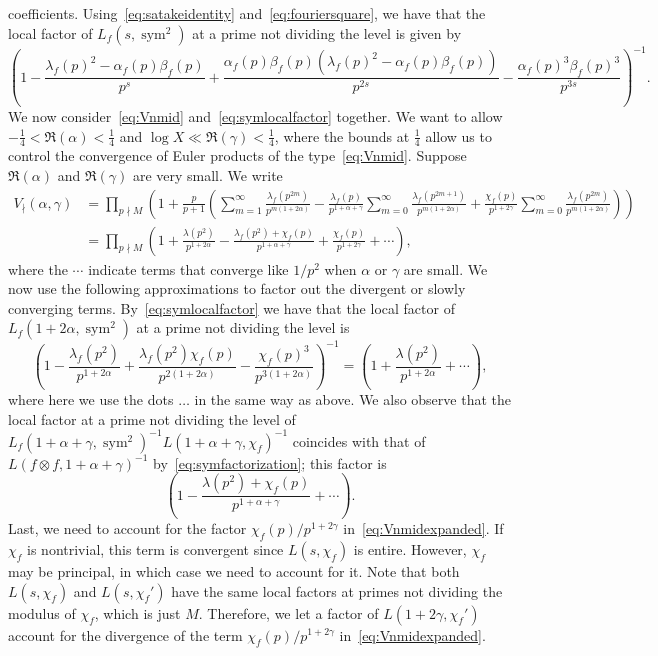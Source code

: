 \documentclass[11pt,reqno]{amsart} \usepackage{fullpage}
\newcommand\be{\begin{equation}}
\newcommand\ee{\end{equation}}
\newcommand{\Lsym}[2][]{L_f#1\left(#2,\sym^2\right)}
\newcommand{\Lchi}[2][]{L(#2,\chi_f#1)}
\DeclareMathOperator{\sym}{sym}
\numberwithin{equation}{section}
\begin{document}
coefficients. Using~\eqref{eq:satakeidentity} and~\eqref{eq:fouriersquare}, we
have that the local factor of $\Lsym{s}$ at a prime not dividing the level
is given by
\be\label{eq:symlocalfactor}
  \left(1-\frac{\lambda_f(p)^2-\alpha_f(p)\beta_f(p)}{p^s}
  + \frac{\alpha_f(p)\beta_f(p)(\lambda_f(p)^2-\alpha_f(p)\beta_f(p))}{p^{2s}}
  - \frac{\alpha_f(p)^3\beta_f(p)^3}{p^{3s}}\right)^{-1}.
\ee
We now consider~\eqref{eq:Vnmid} and~\eqref{eq:symlocalfactor} together.
We want to allow $-\frac14<\Re(\alpha)<\frac14$ and $\log X\ll\Re(\gamma)<\frac14$,
where the bounds at $\frac{1}{4}$ allow us to control the convergence of
Euler products of the type~\eqref{eq:Vnmid}. Suppose
$\Re(\alpha)$ and $\Re(\gamma)$ are very small. We write
\begin{align}
  V_\nmid(\alpha,\gamma)&=\prod_{p\nmid M}
  \left(1+\frac p{p+1}\left(
      \sum_{m=1}^\infty
      \frac{\lambda_f(p^{2m})}{p^{m(1+2\alpha)}}
      -\frac{\lambda_f(p)}{p^{1+\alpha+\gamma}}
      \sum_{m=0}^\infty
      \frac{\lambda_f(p^{2m+1})}{p^{m(1+2\alpha)}}
      +\frac{\chi_f(p)}{p^{1+2\gamma}}
      \sum_{m=0}^\infty
      \frac{\lambda_f(p^{2m})}{p^{m(1+2\alpha)}}
    \right)
  \right) \\
  &=
  \prod_{p\nmid M}\left(1+\frac{\lambda(p^2)}{p^{1+2\alpha}}
    -\frac{\lambda_f(p^2)+\chi_f(p)}{p^{1+\alpha+\gamma}}
    +\frac{\chi_f(p)}{p^{1+2\gamma}}+\cdots\right),
  \label{eq:Vnmidexpanded}
\end{align}
where the $\cdots$ indicate terms that converge like $1/p^2$ when $\alpha$ or
$\gamma$ are small. We now use the following approximations to factor out the
divergent or slowly converging terms. By~\eqref{eq:symlocalfactor} we have
that the local factor of $\Lsym{1+2\alpha}$ at a prime not dividing the level is
\be
\left(1-\frac{\lambda_f(p^2)}{p^{1+2\alpha}}
  +\frac{\lambda_f(p^2)\chi_f(p)}{p^{2(1+2\alpha)}}
  -\frac{\chi_f(p)^3}{p^{3(1+2\alpha)}}
\right)^{-1}
=\left(1+\frac{\lambda(p^2)}{p^{1+2\alpha}}+\cdots\right),
\ee
where here we use the dots $\ldots$ in the same way as above.
We also observe that the local factor at a prime not dividing the level of
$\Lsym{1+\alpha+\gamma}^{-1}\Lchi{1+\alpha+\gamma}^{-1}$ coincides with that
of $L(f\otimes f,1+\alpha+\gamma)^{-1}$ by~\eqref{eq:symfactorization}; this factor
is \be\left(1-\frac{\lambda(p^2)+\chi_f(p)}{p^{1+\alpha+\gamma}}+\cdots\right).\ee
Last, we need to account for the factor $\chi_f(p)/p^{1+2\gamma}$
in~\eqref{eq:Vnmidexpanded}. If $\chi_f$ is nontrivial, this term is convergent
since $\Lchi{s}$ is entire. However, $\chi_f$ may be principal, in which case
we need to account for it. Note that both $\Lchi{s}$ and $\Lchi[']{s}$ have the same
local factors at primes not dividing the modulus of $\chi_f$, which is just $M$.
Therefore, we let a factor of $\Lchi[']{1+2\gamma}$ account for the divergence of
the term $\chi_f(p)/p^{1+2\gamma}$ in~\eqref{eq:Vnmidexpanded}.
\end{document}
